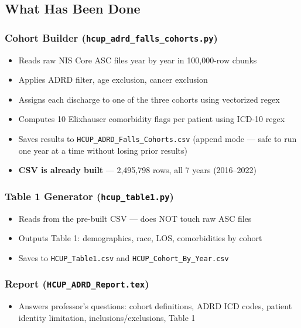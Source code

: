 \documentclass[11pt,letterpaper]{article}
\begin{document}
\subsection{What Has Been Done}

\subsubsection{Cohort Builder (\texttt{hcup\_adrd\_falls\_cohorts.py})}
\begin{itemize}
  \item Reads raw NIS Core ASC files year by year in 100,000-row chunks
  \item Applies ADRD filter, age exclusion, cancer exclusion
  \item Assigns each discharge to one of the three cohorts using vectorized regex
  \item Computes 10 Elixhauser comorbidity flags per patient using ICD-10 regex
  \item Saves results to \texttt{HCUP\_ADRD\_Falls\_Cohorts.csv} (append mode —
        safe to run one year at a time without losing prior results)
  \item \textbf{CSV is already built} — 2,495,798 rows, all 7 years (2016–2022)
\end{itemize}

\subsubsection{Table 1 Generator (\texttt{hcup\_table1.py})}
\begin{itemize}
  \item Reads from the pre-built CSV — does NOT touch raw ASC files
  \item Outputs Table 1: demographics, race, LOS, comorbidities by cohort
  \item Saves to \texttt{HCUP\_Table1.csv} and \texttt{HCUP\_Cohort\_By\_Year.csv}
\end{itemize}

\subsubsection{Report (\texttt{HCUP\_ADRD\_Report.tex})}
\begin{itemize}
  \item Answers professor's questions: cohort definitions, ADRD ICD codes,
        patient identity limitation, inclusions/exclusions, Table 1
\end{itemize}
\end{document}
